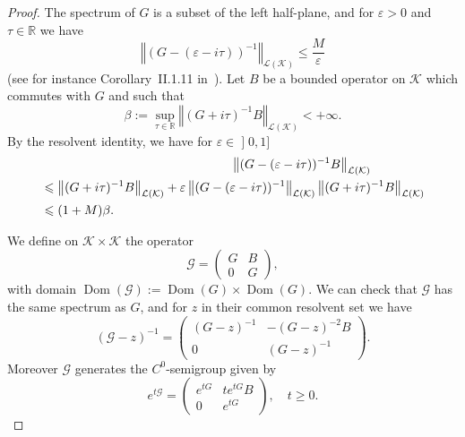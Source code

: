 \documentclass[11pt]{article}
\theoremstyle{definition}
\numberwithin{equation}{section}
\numberwithin{figure}{section}
\numberwithin{table}{section}
\newcommand{\nr}[1]{\left\Vert #1\right\Vert}
\renewcommand{\leq}{\leqslant}
\renewcommand{\geq}{\geqslant}
\newcommand{\inv}{^{-1}}
\newcommand{\1}{\mathds 1}
\DeclareMathOperator{\Dom}{Dom}
\newcommand{\R}{\mathbb{R}}
\renewcommand{\b}{\beta}
\newcommand{\e}{\varepsilon}
\renewcommand{\t}{\tau}
\newcommand{\Gc}{{\mathcal G}}
\newcommand{\Kc}{{\mathcal K}}
\newcommand{\Lc}{{\mathcal L}}
\newcommand{\stepp}{\noindent {\bf $\bullet$}\quad }
\begin{document}
\begin{proof}
The spectrum of $G$ is a subset of the left half-plane, and for $\e > 0$ and $\t \in \R$ we have
\begin{equation}\label{estim-res-G}
\nr{(G-(\e-i\t))\inv}_{\Lc(\Kc)} \leq \frac M \e
\end{equation}
(see for instance Corollary~II.1.11 in~\cite{engel}). Let $B$ be a bounded operator on $\Kc$ which commutes with $G$ and such that
\[
\b := \sup_{\t \in \R} \nr{(G+i\t)^{-1} B}_{\Lc(\Kc)} < +\infty.
\]
By the resolvent identity, we have for $\e \in\mathopen{]}0,1]$
\begin{multline}\label{estim-resG-B}
\lefteqn{\nr{(G-(\e-i\t))\inv B}_{\Lc(\Kc)}}\\
\begin{aligned}
& \leq \nr{(G+i\t)\inv B}_{\Lc(\Kc)} + \e \nr{(G-(\e-i\t))\inv}_{\Lc(\Kc)}\nr{(G+i\t)\inv B}_{\Lc(\Kc)}\\
& \leq (1+M)\b.
\end{aligned}
\end{multline}

We define on $\Kc \times \Kc$ the operator
\[
\Gc =
\begin{pmatrix}
G & B \\
0 & G
\end{pmatrix},
\]
with domain $\Dom(\Gc) := \Dom(G) \times \Dom(G)$. We can check that $\Gc$ has the same spectrum as $G$, and for $z$ in their common resolvent set we have
\[
(\Gc - z)\inv =
\begin{pmatrix}
(G-z)\inv & -(G-z)^{-2} B \\
0 & (G-z)\inv
\end{pmatrix}.
\]
Moreover $\Gc$ generates the $C^0$-semigroup given by
\[
e^{t\Gc} =
\begin{pmatrix}
e^{tG} & t e^{tG} B \\
0 & e^{tG}
\end{pmatrix}, \quad t \geq 0.
\]


\end{proof}
\end{document}

